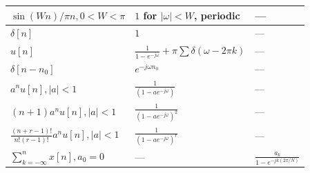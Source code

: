 \documentclass[8pt]{extarticle}
\begin{document}
\begin{table}[h]
\begin{tabular}{|l|l|l|}
        $\sin(Wn)/\pi n, 0<W<\pi$                     & $1$ for $|\omega|<W$, periodic                                                                 & —                                                                                         \\ \hline
        $\delta[n]$                                   & $1$                                                                                            & —                                                                                         \\ \hline
        $u[n]$                                        & $\frac{1}{1 - e^{-j\omega}} + \pi \sum \delta(\omega - 2\pi k)$                                & —                                                                                         \\ \hline
        $\delta[n - n_0]$                             & $e^{-j\omega n_0}$                                                                             & —                                                                                         \\ \hline
        $a^n u[n], |a| < 1$                           & $\frac{1}{(1 - a e^{-j\omega})}$                                                               & —                                                                                         \\ \hline
        $(n+1)a^n u[n], |a| < 1$                      & $\frac{1}{(1 - a e^{-j\omega})^2}$                                                             & —                                                                                         \\ \hline
        $\frac{(n+r-1)!}{n!(r-1)!} a^n u[n], |a| < 1$ & $\frac{1}{(1 - a e^{-j\omega})^r}$                                                             & —                                                                                         \\ \hline
        $\sum_{k=-\infty}^{n}x[n], a_0=0$             & —                                                                                              & $\frac{a_k}{1-e^{-jk(2\pi/N)}}$                                                           \\ \hline
    \end{tabular}
\end{table}
\FloatBarrier
\end{document}
